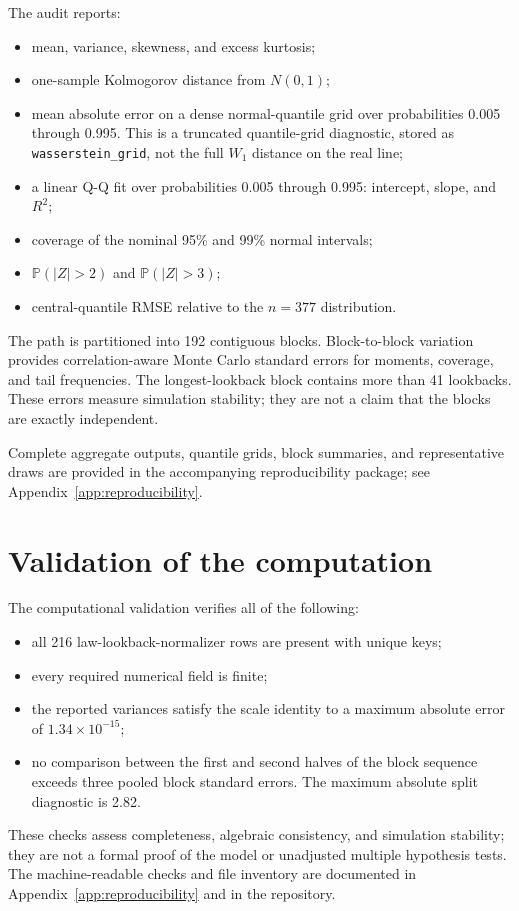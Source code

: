 \documentclass[10pt]{article}
\newcommand{\Prob}{\mathbb{P}}
\begin{document}
The audit reports:
\begin{itemize}
\item mean, variance, skewness, and excess kurtosis;
\item one-sample Kolmogorov distance from \(N(0,1)\);
\item mean absolute error on a dense normal-quantile grid over probabilities
      0.005 through 0.995.  This is a truncated quantile-grid diagnostic,
      stored as \texttt{wasserstein\_grid}, not the full \(W_1\) distance on
      the real line;
\item a linear Q-Q fit over probabilities 0.005 through 0.995: intercept,
      slope, and \(R^2\);
\item coverage of the nominal 95\% and 99\% normal intervals;
\item \(\Prob(|Z|>2)\) and \(\Prob(|Z|>3)\);
\item central-quantile RMSE relative to the \(n=377\) distribution.
\end{itemize}

The path is partitioned into 192 contiguous blocks.  Block-to-block variation
provides correlation-aware Monte Carlo standard errors for moments, coverage,
and tail frequencies.  The longest-lookback block contains more than 41
lookbacks.  These errors measure simulation stability; they are not a claim
that the blocks are exactly independent.

Complete aggregate outputs, quantile grids, block summaries, and
representative draws are provided in the accompanying reproducibility
package; see Appendix~\ref{app:reproducibility}.

\section{Validation of the computation}

The computational validation verifies all of the following:
\begin{itemize}
\item all 216 law-lookback-normalizer rows are present with unique keys;
\item every required numerical field is finite;
\item the reported variances satisfy the scale identity to a maximum absolute
      error of \(1.34\times10^{-15}\);
\item no comparison between the first and second halves of the block sequence
      exceeds three pooled block standard errors.  The maximum absolute split
      diagnostic is 2.82.
\end{itemize}
These checks assess completeness, algebraic consistency, and simulation
stability; they are not a formal proof of the model or unadjusted multiple
hypothesis tests.  The machine-readable checks and file inventory are
documented in Appendix~\ref{app:reproducibility} and in the repository.
\end{document}
